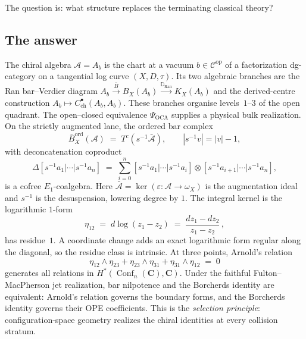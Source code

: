 \documentclass[11pt]{article}
\theoremstyle{plain}
\theoremstyle{definition}
\theoremstyle{remark}
\newcommand{\Ran}{\mathrm{Ran}}
\newcommand{\cA}{\mathcal{A}}
\newcommand{\barB}{\overline{B}}
\newcommand{\Abar}{\bar{\cA}}
\newcommand{\Eone}{E_1}
\DeclareMathOperator{\Conf}{Conf}
\begin{document}
The question is: what structure replaces the terminating classical
theory?

\subsection{The answer}

The chiral algebra $\cA = A_b$ is the chart at a vacuum
$b \in \mathcal{C}^{\mathrm{op}}$ of a factorization dg-category
on a tangential log curve $(X, D, \tau)$.  Its two algebraic branches
are the Ran bar--Verdier diagram
\(A_b\xrightarrow{\bar B}B_X(A_b)
\xrightarrow{\mathbb D_{\Ran}}K_X(A_b)\)
and the derived-centre construction
\(A_b\mapsto C^\bullet_{\mathrm{ch}}(A_b,A_b)\).
These branches organise levels~$1$--$3$ of the open quadrant.  The
open--closed equivalence \(\Psi_{\mathrm{OCA}}\) supplies a physical
bulk realization.
On the strictly augmented lane, the ordered bar complex
\begin{equation}\label{eq:bar-complex-def}
\barB^{\mathrm{ord}}_X(\cA)
\;=\;
T^c(s^{-1}\Abar),
\qquad
|s^{-1}v| = |v| - 1,
\end{equation}
with deconcatenation coproduct
\begin{equation}\label{eq:deconcatenation}
\Delta[s^{-1}a_1 | \cdots | s^{-1}a_n]
\;=\;
\sum_{i=0}^{n}
[s^{-1}a_1 | \cdots | s^{-1}a_i]
\otimes
[s^{-1}a_{i+1} | \cdots | s^{-1}a_n],
\end{equation}
is a cofree $\Eone$-coalgebra. Here
$\Abar = \ker(\varepsilon \colon \cA \to \omega_X)$ is the
augmentation ideal and $s^{-1}$ is the desuspension, lowering
degree by $1$. The integral kernel is the logarithmic $1$-form
\begin{equation}\label{eq:eta}
\eta_{12} \;=\; d\log(z_1 - z_2)
\;=\; \frac{dz_1 - dz_2}{z_1 - z_2}\,,
\end{equation}
has residue~$1$.  A coordinate change adds an exact logarithmic form
regular along the diagonal, so the residue class is intrinsic. At
three points, Arnold's relation \cite{Arnold69}
\begin{equation}\label{eq:arnold}
\eta_{12} \wedge \eta_{23}
+ \eta_{23} \wedge \eta_{31}
+ \eta_{31} \wedge \eta_{12}
\;=\; 0
\end{equation}
generates all relations in
$H^*(\Conf_n(\mathbf{C}), \mathbf{C})$.  Under the faithful
Fulton--MacPherson jet realization, bar nilpotence and the Borcherds
identity are equivalent: Arnold's relation governs the boundary forms,
and the Borcherds identity governs their OPE coefficients.  This is
the \emph{selection principle}: configuration-space geometry realizes
the chiral identities at every collision stratum.
\end{document}
